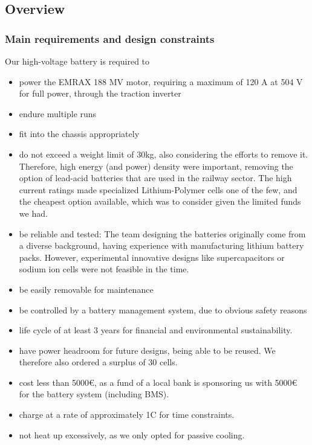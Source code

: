 \subsection{Overview}
\graphicspath{ {./texfiles/electrical/eimc/} }

\subsubsection*{Main requirements and design constraints}
Our high-voltage battery is required to 
\begin{itemize}
    \item power the EMRAX 188 MV motor, requiring a maximum of 120 A at 504 V for full power, through the traction inverter
    \item endure multiple runs 
    \item fit into the chassis appropriately
    \item do not exceed a weight limit of 30kg, also considering the efforts to remove it. Therefore, high energy (and power) density were important, removing the option of lead-acid batteries that are used in the railway sector. The high current ratings made specialized Lithium-Polymer cells one of the few, and the cheapest option available, which was to consider given the limited funds we had.
    \item be reliable and tested: The team designing the batteries originally come from a diverse background, having experience with manufacturing lithium battery packs. However, experimental innovative designs like supercapacitors or sodium ion cells were not feasible in the time. 
    \item be easily removable for maintenance
    \item be controlled by a battery management system, due to obvious safety reasons
    \item life cycle of at least 3 years for financial and environmental sustainability.
    \item have power headroom for future designs, being able to be reused. We therefore also ordered a surplus of 30 cells.
    \item cost less than 5000€, as a fund of a local bank is sponsoring us with 5000€ for the battery system (including BMS).
    \item charge at a rate of approximately 1C for time constraints.
    \item not heat up excessively, as we only opted for passive cooling.
\end{itemize}
